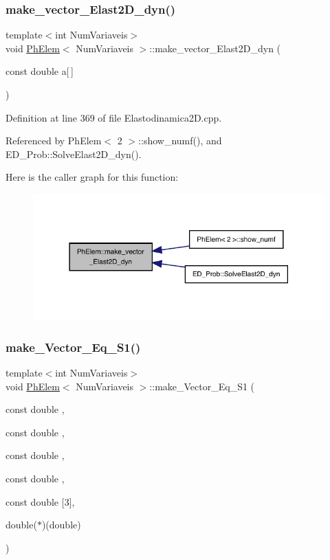 \subsubsection{\texorpdfstring{make\+\_\+vector\+\_\+\+Elast2\+D\+\_\+dyn()}{make\_vector\_Elast2D\_dyn()}}
{\footnotesize\ttfamily template$<$int Num\+Variaveis$>$ \\
void \hyperlink{classPhElem}{Ph\+Elem}$<$ Num\+Variaveis $>$\+::make\+\_\+vector\+\_\+\+Elast2\+D\+\_\+dyn (\begin{DoxyParamCaption}\item[{const double}]{a\mbox{[}$\,$\mbox{]} }\end{DoxyParamCaption})}



Definition at line 369 of file Elastodinamica2\+D.\+cpp.



Referenced by Ph\+Elem$<$ 2 $>$\+::show\+\_\+numf(), and E\+D\+\_\+\+Prob\+::\+Solve\+Elast2\+D\+\_\+dyn().

Here is the caller graph for this function\+:
\nopagebreak
\begin{figure}[H]
\begin{center}
\leavevmode
\includegraphics[width=318pt]{classPhElem_ad5732b2fb83ab0d9a2de7678391f87c4_icgraph}
\end{center}
\end{figure}
\mbox{\label{classPhElem_a5f08c96b39a608ac8500897535998d52}} 
\subsubsection{\texorpdfstring{make\+\_\+\+Vector\+\_\+\+Eq\+\_\+\+S1()}{make\_Vector\_Eq\_S1()}}
{\footnotesize\ttfamily template$<$int Num\+Variaveis$>$ \\
void \hyperlink{classPhElem}{Ph\+Elem}$<$ Num\+Variaveis $>$\+::make\+\_\+\+Vector\+\_\+\+Eq\+\_\+\+S1 (\begin{DoxyParamCaption}\item[{const double}]{,  }\item[{const double}]{,  }\item[{const double}]{,  }\item[{const double}]{,  }\item[{const double}]{\mbox{[}3\mbox{]},  }\item[{double($\ast$)(double)}]{ }\end{DoxyParamCaption})}



